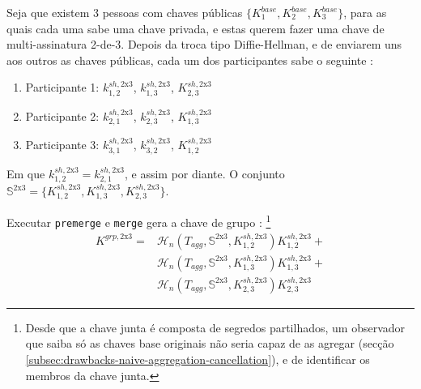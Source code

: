 Seja que existem 3 pessoas com chaves públicas $\{K^{base}_1,K^{base}_2,K^{base}_3\}$, para as quais cada uma sabe uma chave privada, e estas querem fazer uma chave de multi-assinatura 2-de-3. Depois da troca tipo Diffie-Hellman, e de enviarem uns aos outros as chaves públicas, cada um dos participantes sabe o seguinte :    
\begin{enumerate}
    \item Participante 1: $k^{sh,\textrm{2x3}}_{1,2}$, $k^{sh,\textrm{2x3}}_{1,3}$, $K^{sh,\textrm{2x3}}_{2,3}$
    \item Participante 2: $k^{sh,\textrm{2x3}}_{2,1}$, $k^{sh,\textrm{2x3}}_{2,3}$, $K^{sh,\textrm{2x3}}_{1,3}$
    \item Participante 3: $k^{sh,\textrm{2x3}}_{3,1}$, $k^{sh,\textrm{2x3}}_{3,2}$, $K^{sh,\textrm{2x3}}_{1,2}$
\end{enumerate}

Em que $k^{sh,\textrm{2x3}}_{1,2} = k^{sh,\textrm{2x3}}_{2,1}$, e assim por diante. O conjunto $\mathbb{S}^{\textrm{2x3}} = \{ K^{sh,\textrm{2x3}}_{1,2}, K^{sh,\textrm{2x3}}_{1,3}, K^{sh,\textrm{2x3}}_{2,3}\}$.

Executar {\tt premerge} e {\tt merge} gera a chave de grupo :
\footnote{Desde que a chave junta é composta de segredos partilhados, um observador que saiba só as chaves base originais não seria capaz de as agregar (secção \ref{subsec:drawbacks-naive-aggregation-cancellation}), e de identificar os membros da chave junta.} 
\vspace{.175cm}
\begin{align*}
    K^{grp,\textrm{2x3}} = &\mathcal{H}_n(T_{agg},\mathbb{S}^{\textrm{2x3}},K^{sh,\textrm{2x3}}_{1,2}) K^{sh,\textrm{2x3}}_{1,2} + \\
                           &\mathcal{H}_n(T_{agg},\mathbb{S}^{\textrm{2x3}},K^{sh,\textrm{2x3}}_{1,3}) K^{sh,\textrm{2x3}}_{1,3} + \\
                           &\mathcal{H}_n(T_{agg},\mathbb{S}^{\textrm{2x3}},K^{sh,\textrm{2x3}}_{2,3}) K^{sh,\textrm{2x3}}_{2,3}
\end{align*}

